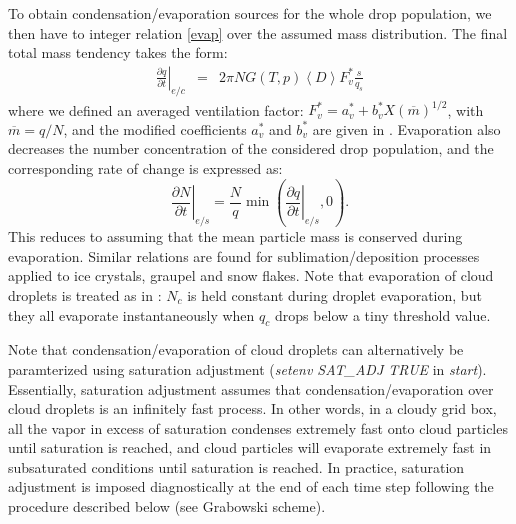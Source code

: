 \documentclass[12pt,A4,french]{article}
\begin{document}
\begin{description}
To obtain condensation/evaporation sources for the whole drop population, we then have to integer relation \ref{evap} over the assumed mass distribution. The final total mass tendency takes the form:
\begin{eqnarray}
\left.\frac{\partial q}{\partial t}\right|_{e/c} &=& 2 \pi N G \left(T,p\right) \left<D\right> F_{v}^{*} \frac{s}{q_{s}}
\label{cond/evap}
\end{eqnarray}
where we defined an averaged ventilation factor: $F_{v}^{*} = a^{*}_{v} + b^{*}_{v}X\left(\overline{m}\right)^{1/2}$, with $\overline{m} = q/N$, and the modified coefficients $a_v^*$ and $b_v^*$ are given in \cite{SB2006}. Evaporation also decreases the number concentration of the considered drop population, and the corresponding rate of change is expressed as:
\begin{equation}
\left.\frac{\partial N}{\partial t}\right|_{e/s} = \frac{N}{q}\min\left(\left.\frac{\partial q}{\partial t}\right|_{e/s}, 0\right).
\end{equation}
This reduces to assuming that the mean particle mass is conserved during evaporation. Similar relations are found for sublimation/deposition processes applied to ice crystals, graupel and snow flakes. Note that evaporation of cloud droplets is treated as in \cite{Mal2005}: $N_c$ is held constant during droplet evaporation, but they all evaporate instantaneously when $q_c$ drops below a tiny threshold value.

Note that condensation/evaporation of cloud droplets can alternatively be paramterized using saturation adjustment ({\it setenv SAT\_ADJ TRUE} in {\it start}). Essentially, saturation adjustment assumes that condensation/evaporation over cloud droplets is an infinitely fast process. In other words, in a cloudy grid box, all the vapor in excess of saturation condenses extremely fast onto cloud particles until saturation is reached, and cloud particles will evaporate extremely fast in subsaturated conditions until saturation is reached. In practice, saturation adjustment is imposed diagnostically at the end of each time step following the procedure described below (see Grabowski scheme).


\end{description}
\end{document}
